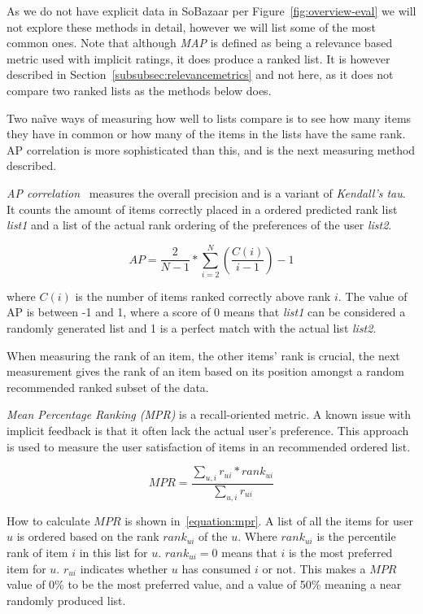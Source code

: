 As we do not have explicit data in SoBazaar per Figure~\ref{fig:overview-eval}
we will not explore these methods in detail, however we will list some of the
most common ones. Note that although \textit{MAP} is defined as being a
relevance based metric used with implicit ratings, it does produce a ranked
list. It is however described in Section~\ref{subsubsec:relevancemetrics} and not here, as it does not
compare two ranked lists as the methods below does.


Two naĩve ways of measuring how well to lists compare is to see how many items they have in common or how many of the items in the lists have the same rank. AP correlation is more sophisticated than this, and is the next measuring method described.

\textit{AP correlation}~\cite{Yilmaz:2008:NRC:1390334.1390435} measures the
overall precision and is a variant of \textit{Kendall's tau}.  It counts the
amount of items correctly placed in a ordered predicted rank list
\textit{list1} and a list of the actual rank ordering of the preferences of the
user \textit{list2}.

\begin{equation}
	AP = \frac{2}{N - 1} * \sum_{i=2}^{N}{(\frac{C(i)}{i - 1})} - 1
	\label{equation:ap}
\end{equation}

where $C(i)$ is the number of items ranked correctly above rank $i$.
The value of AP is between -1 and 1, where a score of 0 means that
\textit{list1} can be considered a randomly generated list and 1 is a perfect
match with the actual list \textit{list2}.

When measuring the rank of an item, the other items' rank is crucial, the next measurement gives the rank of an item based on its position amongst a random recommended ranked subset of the data.

\textit{Mean Percentage Ranking (MPR)} is a recall-oriented metric.  A known
issue with implicit feedback is that it often lack the actual user's
preference.  This approach is used to measure the user satisfaction of items in
an recommended ordered list.

\begin{equation}
	MPR = \frac{\sum_{u,i}{r_{ui} * rank_{ui}}}{\sum_{u,i}{r_{ui}}}
	\label{equation:mpr}
\end{equation}

How to calculate $MPR$ is shown in~\ref{equation:mpr}.  A list of all the items
for user $u$ is ordered based on the rank $rank_{ui}$ of the $u$.  Where
$rank_{ui}$ is the percentile rank of item $i$ in this list for $u$.
$rank_{ui} = 0$ means that $i$ is the most preferred item for $u$.  $r_{ui}$
indicates whether $u$ has consumed $i$ or not.  This makes a $MPR$ value of
0\% to be the most preferred value, and a value of 50\% meaning a near
randomly produced list.

